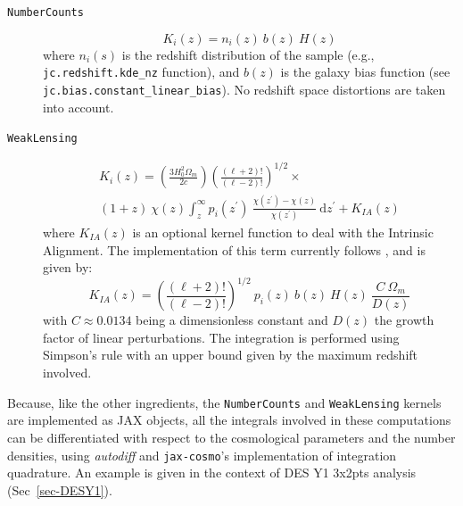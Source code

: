 \documentclass[twocolumn,twocolappendix,nofootinbib,iop]{openjournal}
\newcommand{\FrL}[1]{{\color{cyan}FL: #1}}
\newcommand{\resubnote}[1]{#1} %
\newcommand{\jaxcosmo}{\texttt{jax-cosmo}}
\begin{document}
\begin{description}
\item[\texttt{NumberCounts}]
    \begin{equation}
        K_i(z) = n_i(z)\ b(z)\ H(z)
    \end{equation}
where $n_i(s)$ is the redshift distribution of the sample (e.g., \texttt{jc.redshift.kde\_nz} function), and $b(z)$ is the galaxy bias function (see  \texttt{jc.bias.constant\_linear\_bias}). No redshift space distortions are taken into account.

\item [\texttt{WeakLensing}]
    \begin{multline}
 K_i(z) = \left( \frac{3 H_0^2\Omega_m}{2 c} \right) \left(\frac{(\ell+2)!}{(\ell-2)!} \right)^{1/2}\times 
 \\  (1+z)\ \chi(z) \int_z^\infty p_i(z^\prime)\ \frac{\chi(z^\prime)-\chi(z)}{\chi(z^\prime)}\ \mathrm{d}z^\prime + K_{IA}(z)
    \end{multline}
where $K_{IA}(z)$ is an optional kernel function to deal with the Intrinsic Alignment. The implementation of this term currently follows \citet{2011A&A...527A..26J}, and is given by:
\begin{equation}
    K_{IA}(z) = \left(\frac{(\ell+2)!}{(\ell-2)!}\right)^{1/2}\ p_i(z)\ b(z)\  H(z)\ \frac{C\  \Omega_m}{D(z)}
\end{equation}
with $C\approx 0.0134$ being a dimensionless constant and $D(z)$ the growth factor of linear perturbations. \resubnote{The integration is performed using Simpson's rule with an upper bound given by the maximum redshift involved.}
\end{description}



Because, like the other ingredients, the \texttt{NumberCounts} and \texttt{WeakLensing} kernels are implemented as JAX objects, all the integrals involved in these computations can be differentiated with respect to the cosmological parameters and the number densities, using \textit{autodiff} and \jaxcosmo's implementation of integration quadrature. An example is given in the context of DES Y1 3x2pts analysis (Sec~\ref{sec-DESY1}).
%
\end{document}
